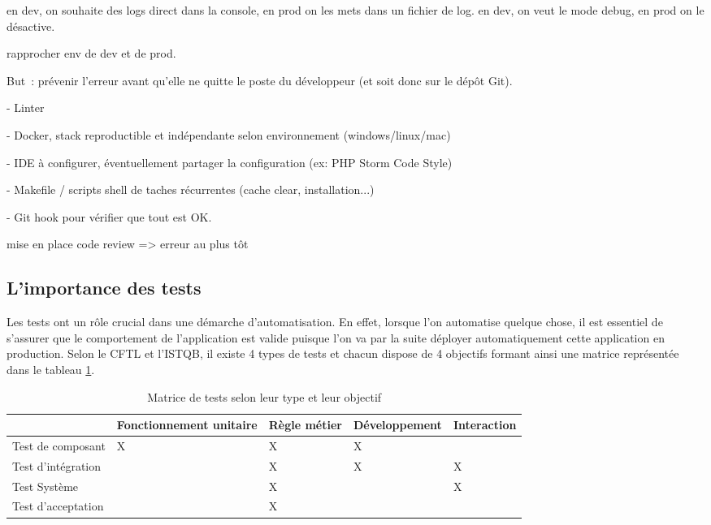 en dev, on souhaite des logs direct dans la console, en prod on les mets dans un fichier de log.
en dev, on veut le mode debug, en prod on le désactive.

rapprocher env de dev et de prod.

But : prévenir l'erreur avant qu'elle ne quitte le poste du développeur (et soit donc sur le dépôt Git).

-  Linter

-  Docker, stack reproductible et indépendante selon environnement (windows/linux/mac) 

- IDE à configurer, éventuellement partager la configuration (ex: PHP Storm Code Style)

-  Makefile / scripts shell de taches récurrentes (cache clear, installation...)

- Git hook pour vérifier que tout est OK.

mise en place code review => erreur au plus tôt

\subsection{L'importance des tests} \label{importance-test}

Les tests ont un rôle crucial dans une démarche d'automatisation. En effet, lorsque l'on automatise quelque chose, il est essentiel de s'assurer que le comportement de l'application est valide puisque l'on va par la suite déployer automatiquement cette application en production. Selon le \gls{CFTL} et l'\gls{ISTQB}, il existe 4 types de tests et chacun dispose de 4 objectifs formant ainsi une matrice représentée dans le tableau \ref{tab:matrice-test}.


\begin{table}[H]
	\centering
	\begin{adjustbox}{width=0.95\textwidth,center=\textwidth} 
		\begin{tabular}{|l|l|l|l|l|}
			\hline
			\diagbox{type de test}{valide} & Fonctionnement unitaire & Règle métier & Développement & Interaction \\ \hline
			Test de composant     & X                       & X            & X              &             \\ \hline
			Test d'intégration    &                         & X            & X              & X           \\ \hline
			Test Système          &                         & X            &               & X           \\ \hline
			Test d'acceptation    &                         & X            &               &             \\ \hline
		\end{tabular}
	\end{adjustbox}
	\caption{Matrice de tests selon leur type et leur objectif}
	\label{tab:matrice-test}
\end{table}

